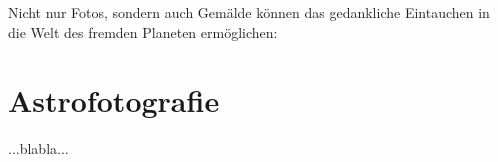 \cleardoubleoddpage

%

\cleardoubleoddpage

%

\cleardoubleoddpage

%

\cleardoubleoddpage

%

\cleardoubleoddpage

%

\cleardoubleoddpage

%

\cleardoubleoddpage

%

\cleardoubleoddpage

%

\cleardoubleoddpage

%

\cleardoubleoddpage

%

\cleardoubleoddpage

Nicht nur Fotos, sondern auch Gemälde können das gedankliche Eintauchen in die Welt des fremden Planeten ermöglichen:

\cleardoubleoddpage

%

\cleardoubleoddpage

%

\cleardoubleoddpage

%

\cleardoubleoddpage


\chapter{Astrofotografie}

...blabla...




